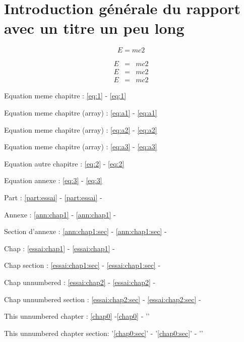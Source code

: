 \documentclass[bare]{polytech/polytech}
\begin{document}
             
\chapter*[Titre court pour l'entête]{Introduction générale du rapport avec un titre un peu long}

\label{sec:0}    
\label{chap0}    

\begin{equation}
\label{eq:1} 
E=mc2
\end{equation}     

\begin{eqnarray}
\label{eq:a1}
E&=&mc2\\
\label{eq:a2}   
E&=&mc2\\
\label{eq:a3}
E&=&mc2 
\end{eqnarray}          
 
Equation meme chapitre : \autoref{eq:1} - \eqref{eq:1}
 
Equation meme chapitre (array) : \autoref{eq:a1} - \eqref{eq:a1}

Equation meme chapitre (array) : \autoref{eq:a2} - \eqref{eq:a2}

Equation meme chapitre (array) : \autoref{eq:a3} - \eqref{eq:a3}

Equation autre chapitre : \autoref{eq:2} - \eqref{eq:2}


Equation annexe :  \autoref{eq:3}   - \eqref{eq:3}  
      
Part : \ref{part:essai} - \autoref{part:essai} -             
       
Annexe : \ref{ann:chap1} - \autoref{ann:chap1} -               
 
Section d'annexe : \ref{ann:chap1:sec} - \autoref{ann:chap1:sec} -           
 
 Chap : \ref{essai:chap1} - \autoref{essai:chap1} - 
            
Chap section : \ref{essai:chap1:sec} - \autoref{essai:chap1:sec} - 


Chap unnumbered : \ref{essai:chap2} - \autoref{essai:chap2} -        

Chap unnumbered section : \ref{essai:chap2:sec} - \autoref{essai:chap2:sec} - 

This unnumbered chapter : \ref{chap0} -\autoref{chap0} - ''  
  
This unnumbered chapter section: '\ref{chap0:sec}' - '\autoref{chap0:sec}' - ''  
\end{document}
